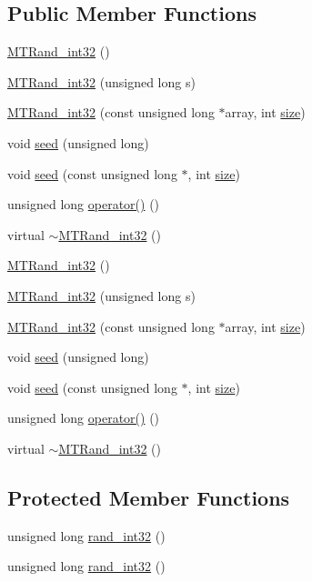 \subsection*{Public Member Functions}
\begin{DoxyCompactItemize}
\item 
\hyperlink{a00019_a034f223c086f5368bd220b02f2cc12a8}{M\-T\-Rand\-\_\-int32} ()
\item 
\hyperlink{a00019_ad30f7c63a6f1fb3c3b76b8ce6ffa0206}{M\-T\-Rand\-\_\-int32} (unsigned long s)
\item 
\hyperlink{a00019_a19acddb3910a7282517b2ffc398b92b4}{M\-T\-Rand\-\_\-int32} (const unsigned long $\ast$array, int \hyperlink{a00104_ae113ea7f9e515a12ac4b5595c6faf61e}{size})
\item 
void \hyperlink{a00019_a0c57076fe30358e0700a7ce1baa0ea27}{seed} (unsigned long)
\item 
void \hyperlink{a00019_a3cabc1e3445716236a570ffd2f69686d}{seed} (const unsigned long $\ast$, int \hyperlink{a00104_ae113ea7f9e515a12ac4b5595c6faf61e}{size})
\item 
unsigned long \hyperlink{a00019_ad7fe22190d0411c6dac8e6f471633aa4}{operator()} ()
\item 
virtual \hyperlink{a00019_a364900abea0758d070ce89922159923a}{$\sim$\-M\-T\-Rand\-\_\-int32} ()
\item 
\hyperlink{a00019_a034f223c086f5368bd220b02f2cc12a8}{M\-T\-Rand\-\_\-int32} ()
\item 
\hyperlink{a00019_ad30f7c63a6f1fb3c3b76b8ce6ffa0206}{M\-T\-Rand\-\_\-int32} (unsigned long s)
\item 
\hyperlink{a00019_a19acddb3910a7282517b2ffc398b92b4}{M\-T\-Rand\-\_\-int32} (const unsigned long $\ast$array, int \hyperlink{a00104_ae113ea7f9e515a12ac4b5595c6faf61e}{size})
\item 
void \hyperlink{a00019_a0c57076fe30358e0700a7ce1baa0ea27}{seed} (unsigned long)
\item 
void \hyperlink{a00019_a3cabc1e3445716236a570ffd2f69686d}{seed} (const unsigned long $\ast$, int \hyperlink{a00104_ae113ea7f9e515a12ac4b5595c6faf61e}{size})
\item 
unsigned long \hyperlink{a00019_ad7fe22190d0411c6dac8e6f471633aa4}{operator()} ()
\item 
virtual \hyperlink{a00019_a364900abea0758d070ce89922159923a}{$\sim$\-M\-T\-Rand\-\_\-int32} ()
\end{DoxyCompactItemize}
\subsection*{Protected Member Functions}
\begin{DoxyCompactItemize}
\item 
unsigned long \hyperlink{a00019_abacdfa346255baeac69d29bb57f29b22}{rand\-\_\-int32} ()
\item 
unsigned long \hyperlink{a00019_abacdfa346255baeac69d29bb57f29b22}{rand\-\_\-int32} ()
\end{DoxyCompactItemize}


